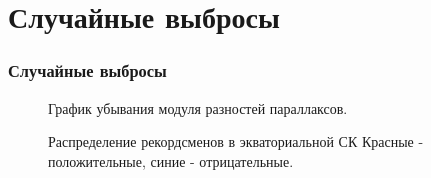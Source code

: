 \documentclass[14pt,aspectratio=43]{beamer}
\begin{document}
\section{Случайные выбросы}\label{sub:smthrs}

\begin{frame}[<alignment>]
\frametitle{Случайные выбросы}

\begin{figure}[h!]
\caption{График убывания модуля разностей параллаксов.}
\end{figure}

\end{frame}

\begin{frame}[<alignment>]

\begin{figure}[h!]
\caption{Распределение рекордсменов в экваториальной СК  Красные - положительные, синие - отрицательные.}
\end{figure}
\end{frame}
\end{document}
